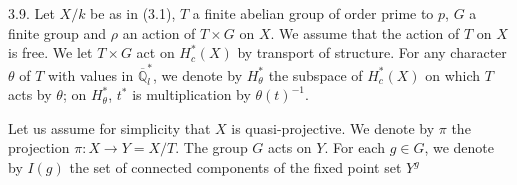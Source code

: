 \documentclass[9pt,twoside]{extarticle}
\begin{document}
{3.9. Let \(X/k\) be as in (3.1), \(T\) a finite abelian group of order prime to \(p\), \(G\) a finite group and \(\rho\) an action of \(T\times G\) on \(X\). We assume that the action of \(T\) on \(X\) is free. We let \(T\times G\) act on \(H_c^*(X)\) by transport of structure. For any character \(\theta\) of \(T\) with values in \(\overline{\mathbb Q}_l^*\), we denote by \(H_\theta^*\) the subspace of \(H_c^*(X)\) on which \(T\) acts by \(\theta\); on \(H_\theta^*\), \(t^*\) is multiplication by \(\theta(t)^{-1}\).\par

Let us assume for simplicity that \(X\) is quasi-projective. We denote by \(\pi\) the projection \(\pi:X\to Y=X/T\). The group \(G\) acts on \(Y\). For each \(g\in G\), we denote by \(I(g)\) the set of connected components of the fixed point set \(Y^g\)\par
}
\end{document}
